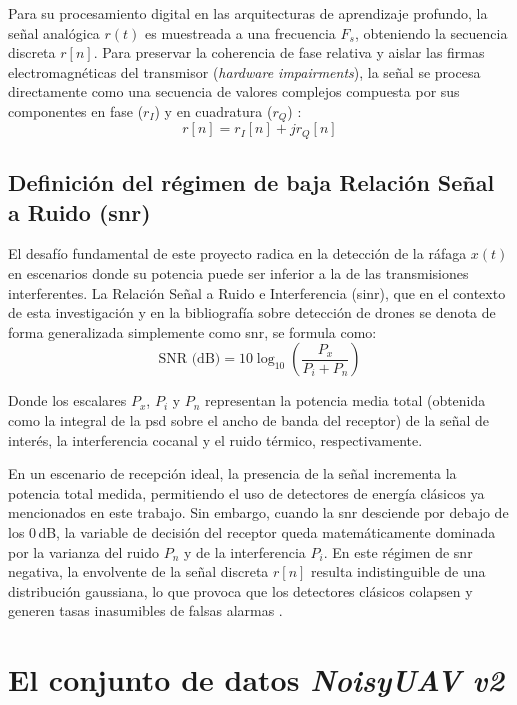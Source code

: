 Para su procesamiento digital en las arquitecturas de aprendizaje profundo, la señal analógica $r(t)$ es muestreada a una frecuencia $F_s$, obteniendo la secuencia discreta $r[n]$. Para preservar la coherencia de fase relativa y aislar las firmas electromagnéticas del transmisor (\textit{hardware impairments}), la señal se procesa directamente como una secuencia de valores complejos compuesta por sus componentes en fase ($r_I$) y en cuadratura ($r_Q$) \cite{valkama_blind_2005, zheng_deep_2025}:
\begin{equation}
    r[n] = r_I[n] + j r_Q[n]
    \label{eq:iq_discreta}
\end{equation}

\subsection{Definición del régimen de baja Relación Señal a Ruido (\gls{snr})}
El desafío fundamental de este proyecto radica en la detección de la ráfaga $x(t)$ en escenarios donde su potencia puede ser inferior a la de las transmisiones interferentes. La Relación Señal a Ruido e Interferencia (\gls{sinr}), que en el contexto de esta investigación y en la bibliografía sobre detección de drones se denota de forma generalizada simplemente como \gls{snr}, se formula como:
\begin{equation}
    \text{SNR (dB)} = 10 \log_{10} \left( \frac{P_x}{P_i + P_n} \right)
    \label{eq:snr_calculo}
\end{equation}

Donde los escalares $P_x$, $P_i$ y $P_n$ representan la potencia media total (obtenida como la integral de la \gls{psd} sobre el ancho de banda del receptor) de la señal de interés, la interferencia cocanal y el ruido térmico, respectivamente. 

En un escenario de recepción ideal, la presencia de la señal incrementa la potencia total medida, permitiendo el uso de detectores de energía clásicos ya mencionados en este trabajo. Sin embargo, cuando la \gls{snr} desciende por debajo de los 0\,dB, la variable de decisión del receptor queda matemáticamente dominada por la varianza del ruido $P_n$ y de la interferencia $P_i$. En este régimen de \gls{snr} negativa, la envolvente de la señal discreta $r[n]$ resulta indistinguible de una distribución gaussiana, lo que provoca que los detectores clásicos colapsen y generen tasas inasumibles de falsas alarmas \cite{lacy_machine_2024}.

\section{El conjunto de datos \textit{NoisyUAV v2}}
\label{sec:dataset_noisyuav}


